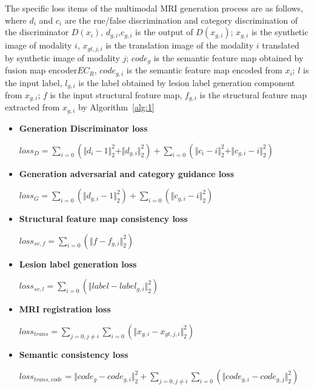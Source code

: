 \documentclass[letterpaper]{article} %
\begin{document}
The specific loss items of the multimodal MRI generation process are as follows, where $d_{i}$ and $c_{i}$ are the rue/false discrimination and category discrimination of the discriminator $D(x_i)$, $d_{g, i}$,$c_{g,i}$ is the output of $D(x_{g,i})$; $x_{g,i}$ is the synthetic image of modality $i$, $x_{gt,j,i}$ is the translation image of the modality $i$ translated by synthetic image of modality $j$; $code_g$ is the semantic feature map obtained by fusion map encoder$EC_R$, $code_{g,i}$ is the semantic feature map encoded from $x_i$; $l$ is the input label, $l_{g,i}$ is the label obtained by lesion label generation component from $x_{g,i}$; $f$ is the input structural feature map, $f_{g,i}$ is the structural feature map extracted from $x_{g,i}$ by Algorithm~\ref{alg:1}
\begin{itemize}
	\item \textbf{Generation Discriminator loss }
	\begin{center}
		$loss_{D}=\sum\limits_{i=0}(\Vert{d_{i}-1}\Vert_{2}^{2}+\Vert{d_{g,i}}\Vert_{2}^{2})+\sum\limits_{i=0}(\Vert{c_{i}-i}\Vert_{2}^{2}+\Vert{c_{g,i}-i}\Vert_{2}^{2})$
	\end{center}

	\item \textbf{Generation adversarial and category guidance loss}
	\begin{center}
		$loss_{G}=\sum\limits_{i=0}(\Vert{d_{g,i}-1}\Vert_{2}^{2})+\sum\limits_{i=0}(\Vert{c_{g,i}-i}\Vert_{2}^{2})$
	\end{center}
	
	\item \textbf{Structural feature map consistency loss}
	\begin{center}
		$loss_{sv,f}=\sum\limits_{i=0}(\Vert{f-f_{g,i}}\Vert_{2}^{2})$
	\end{center}
	
	\item \textbf{Lesion label generation loss}
	\begin{center}
		$loss_{sv,l}=\sum\limits_{i=0}(\Vert{label-label_{g,i}}\Vert_{2}^{2})$
	\end{center}
	
	\item \textbf{MRI registration loss}
	\begin{center}
		$loss_{trans}=\sum\limits_{j=0,j\neq i}\sum\limits_{i=0}(\Vert{x_{g,i}-x_{gt,j,i}}\Vert_{2}^{2})$
	\end{center}
	
	\item \textbf{Semantic consistency loss}
	\begin{center}
		$loss_{trans,code}=\Vert{code_g-code_{g,i}}\Vert_{2}^{2}+\sum\limits_{j=0,j\neq i}\sum\limits_{i=0}(\Vert{code_{g,i}-code_{g,j}}\Vert_{2}^{2})$
	\end{center}
	
\end{itemize}
\end{document}
